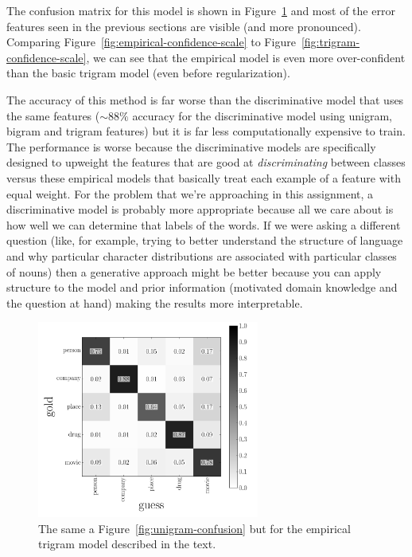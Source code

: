 \documentclass[11pt]{article}
\newcommand{\fig}[1]{Figure~\ref{fig:#1}}
\newcommand{\figlabel}[1]{\label{fig:#1}}
\begin{document}
The confusion matrix for this model is shown in \fig{empirical-confusion} and
most of the error features seen in the previous sections are visible (and more
pronounced).
Comparing \fig{empirical-confidence-scale} to \fig{trigram-confidence-scale},
we can see that the empirical model is even more over-confident than the basic
trigram model (even before regularization).

The accuracy of this method is far worse than the discriminative model that
uses the same features ($\sim 88\%$ accuracy for the discriminative model
using unigram, bigram and trigram features) but it is far less computationally
expensive to train.
The performance is worse because the discriminative models are specifically
designed to upweight the features that are good at \emph{discriminating}
between classes versus these empirical models that basically treat each
example of a feature with equal weight.
For the problem that we're approaching in this assignment, a discriminative
model is probably more appropriate because all we care about is how well we
can determine that labels of the words.
If we were asking a different question (like, for example, trying to better
understand the structure of language and why particular character
distributions are associated with particular classes of nouns) then a
generative approach might be better because you can apply structure to the
model and prior information (motivated domain knowledge and the question at
hand) making the results more interpretable.

\begin{figure}[htbp]
\begin{center}
    \includegraphics[width=0.65\textwidth]{empirical_confusion.pdf}
\end{center}
\caption{%
The same a \fig{unigram-confusion} but for the empirical trigram model
described in the text.
\figlabel{empirical-confusion}}
\end{figure}
\end{document}
